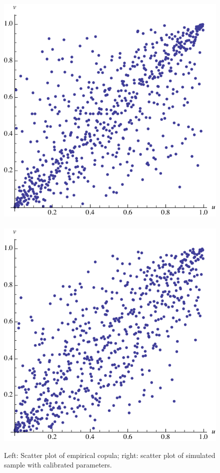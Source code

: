 \begin{figure}[t]
  \centering
  \includegraphics[scale=.5]{_pics/copula_nig1.pdf}\ \ \ \ \ 
  \includegraphics[scale=.5]{_pics/copula_nig2.pdf}
  \caption{Left: Scatter plot of empirical copula; right: scatter plot
    of simulated sample with calibrated parameters.}
  \label{fig:copula_nig}
\end{figure}



